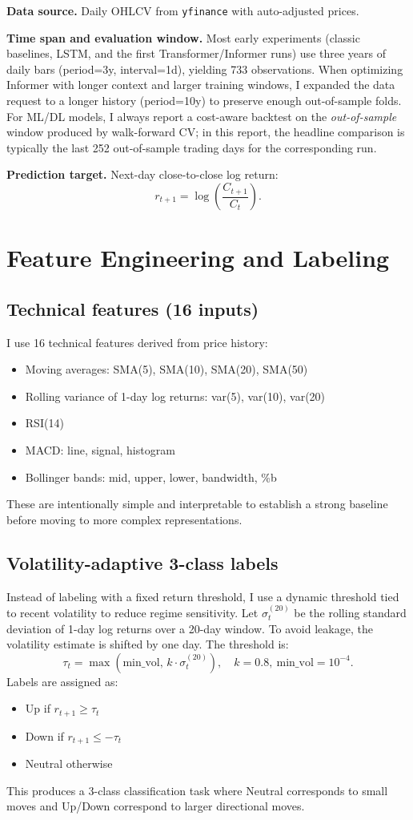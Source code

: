 \documentclass[letterpaper]{article} %
\begin{document}
\textbf{Data source.} Daily OHLCV from \texttt{yfinance} with auto-adjusted prices.

\textbf{Time span and evaluation window.} Most early experiments (classic baselines, LSTM, and the first Transformer/Informer runs) use three years of daily bars (period=3y, interval=1d), yielding 733 observations. When optimizing Informer with longer context and larger training windows, I expanded the data request to a longer history (period=10y) to preserve enough out-of-sample folds. For ML/DL models, I always report a cost-aware backtest on the \emph{out-of-sample} window produced by walk-forward CV; in this report, the headline comparison is typically the last 252 out-of-sample trading days for the corresponding run.

\textbf{Prediction target.} Next-day close-to-close log return:
\[
r_{t+1}=\log\left(\frac{C_{t+1}}{C_t}\right).
\]

\section{Feature Engineering and Labeling}
\subsection{Technical features (16 inputs)}
I use 16 technical features derived from price history:
\begin{itemize}
  \item Moving averages: SMA(5), SMA(10), SMA(20), SMA(50)
  \item Rolling variance of 1-day log returns: var(5), var(10), var(20)
  \item RSI(14)
  \item MACD: line, signal, histogram
  \item Bollinger bands: mid, upper, lower, bandwidth, \%b
\end{itemize}
These are intentionally simple and interpretable to establish a strong baseline before moving to more complex representations.

\subsection{Volatility-adaptive 3-class labels}
Instead of labeling with a fixed return threshold, I use a dynamic threshold tied to recent volatility to reduce regime sensitivity. Let $\sigma^{(20)}_t$ be the rolling standard deviation of 1-day log returns over a 20-day window. To avoid leakage, the volatility estimate is shifted by one day. The threshold is:
\[
\tau_t=\max(\text{min\_vol},\,k\cdot\sigma_{t}^{(20)}),\quad k=0.8,\ \text{min\_vol}=10^{-4}.
\]
Labels are assigned as:
\begin{itemize}
  \item Up if $r_{t+1}\ge \tau_t$
  \item Down if $r_{t+1}\le -\tau_t$
  \item Neutral otherwise
\end{itemize}
This produces a 3-class classification task where Neutral corresponds to small moves and Up/Down correspond to larger directional moves.
\end{document}
